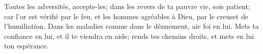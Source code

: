 Toutes les adversités, accepte-les;
	dans les revers de ta pauvre vie, sois patient;
	car l’or est vérifié par le feu,
	et les hommes agréables à Dieu, par le creuset de l’humiliation.
Dans les maladies comme dans le dénuement, aie foi en lui.
Mets ta confiance en lui, et il te viendra en aide;
	rends tes chemins droits, et mets en lui ton espérance.
